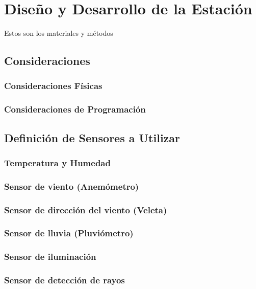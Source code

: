 \documentclass[12pt,letterpaper]{article}
\begin{document}
\begin{sloppypar}
        \section{Diseño y Desarrollo de la Estación}
        Estos son los materiales y métodos

        \subsection{Consideraciones}

        \subsubsection{Consideraciones Físicas}

        \subsubsection{Consideraciones de Programación}

        \subsection{Definición de Sensores a Utilizar}

        \subsubsection{Temperatura y Humedad}

        \subsubsection{Sensor de viento (Anemómetro)}

        \subsubsection{Sensor de dirección del viento (Veleta)}

        \subsubsection{Sensor de lluvia (Pluviómetro)}

        \subsubsection{Sensor de iluminación}

        \subsubsection{Sensor de detección de rayos}


\end{sloppypar}
\end{document}
